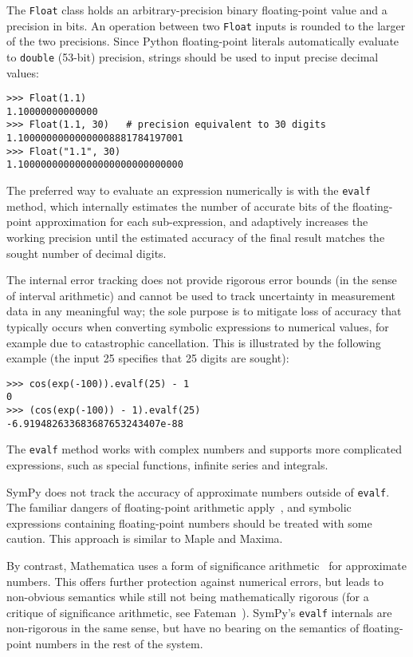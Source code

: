 The \texttt{Float} class holds an arbitrary-precision binary floating-point value
and a precision in bits. An operation between two \texttt{Float}
inputs is rounded to the larger of the two precisions.
Since Python floating-point literals automatically evaluate to \texttt{double}
(53-bit) precision, strings should be used to input precise decimal values:

\begin{verbatim}
>>> Float(1.1)
1.10000000000000
>>> Float(1.1, 30)   # precision equivalent to 30 digits
1.10000000000000008881784197001
>>> Float("1.1", 30)
1.10000000000000000000000000000
\end{verbatim}

The preferred way to evaluate an expression numerically is with the
\texttt{evalf} method, which internally estimates the number of accurate
bits of the floating-point
approximation for each sub-expression, and adaptively increases the
working precision until the estimated accuracy of the
final result matches the sought number of decimal digits.

The internal error tracking does not provide rigorous error bounds
(in the sense of interval arithmetic) and cannot be used to track
uncertainty in measurement data in any meaningful way;
the sole purpose is to mitigate loss of accuracy that typically occurs
when converting symbolic expressions to numerical values, for example
due to catastrophic cancellation. This is illustrated by the following
example (the input 25 specifies that 25 digits are sought):

\begin{verbatim}
>>> cos(exp(-100)).evalf(25) - 1
0
>>> (cos(exp(-100)) - 1).evalf(25)
-6.919482633683687653243407e-88
\end{verbatim}

The \texttt{evalf} method works with complex numbers and supports
more complicated expressions, such as
special functions, infinite series and integrals.

SymPy does not track the accuracy of
approximate numbers outside of \texttt{evalf}.
The familiar dangers of floating-point arithmetic apply~\cite{goldberg1991every}, and
symbolic expressions containing floating-point numbers should be treated
with some caution.
This approach is similar to Maple and Maxima.

By contrast, Mathematica uses a form
of significance arithmetic~\cite{Sofroniou2005precise} for approximate numbers.
This offers further protection against numerical errors,
but leads to non-obvious semantics while
still not being mathematically rigorous
(for a critique of significance arithmetic, see Fateman~\cite{Fateman1992}).
SymPy's \texttt{evalf} internals are non-rigorous in the same sense,
but have no bearing on the semantics of floating-point
numbers in the rest of the system.

